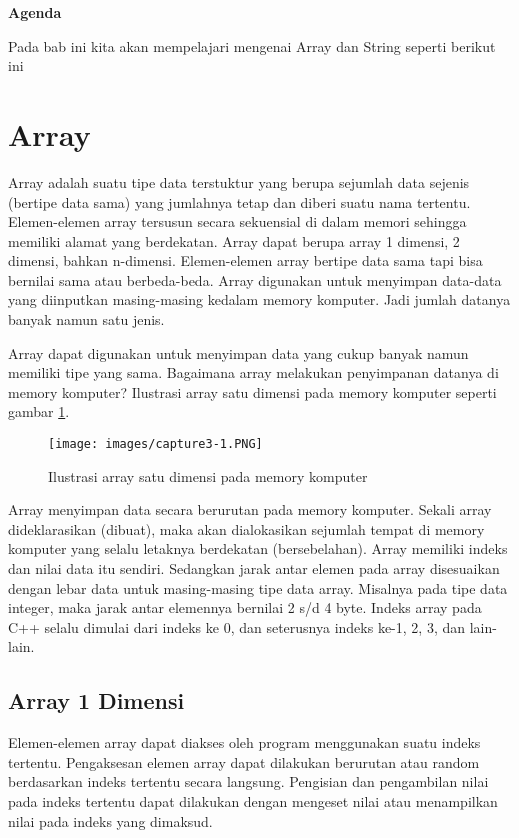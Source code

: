 \textbf{Agenda}

Pada bab ini kita akan mempelajari mengenai Array dan String seperti berikut ini

\minitoc

\section{ Array}\label{array}

Array adalah suatu tipe data terstuktur yang berupa sejumlah data
sejenis (bertipe data sama) yang jumlahnya tetap dan diberi suatu nama
tertentu. Elemen-elemen array tersusun secara sekuensial di dalam memori
sehingga memiliki alamat yang berdekatan. Array dapat berupa array 1
dimensi, 2 dimensi, bahkan n-dimensi. Elemen-elemen array bertipe data
sama tapi bisa bernilai sama atau berbeda-beda. Array digunakan untuk
menyimpan data-data yang diinputkan masing-masing kedalam memory
komputer. Jadi jumlah datanya banyak namun satu jenis.

Array dapat digunakan untuk menyimpan data yang cukup banyak namun
memiliki tipe yang sama. Bagaimana array melakukan penyimpanan datanya
di memory komputer? Ilustrasi array satu dimensi pada memory komputer 
seperti gambar \ref{gambar3-1}.

\begin{figure}[htbp]
\centering
\texttt{[image: images/capture3-1.PNG]}
\label{gambar3-1}
\caption{Ilustrasi array satu dimensi pada memory komputer}
\end{figure}

Array menyimpan data secara berurutan pada memory komputer. Sekali array
dideklarasikan (dibuat), maka akan dialokasikan sejumlah tempat di
memory komputer yang selalu letaknya berdekatan (bersebelahan). Array
memiliki indeks dan nilai data itu sendiri. Sedangkan jarak antar elemen
pada array disesuaikan dengan lebar data untuk masing-masing tipe data
array. Misalnya pada tipe data integer, maka jarak antar elemennya
bernilai 2 s/d 4 byte. Indeks array pada C++ selalu dimulai dari indeks
ke 0, dan seterusnya indeks ke-1, 2, 3, dan lain-lain.

\subsection{Array 1 Dimensi}\label{array-1-dimensi}

Elemen-elemen array dapat diakses oleh program menggunakan suatu indeks
tertentu. Pengaksesan elemen array dapat dilakukan berurutan atau random
berdasarkan indeks tertentu secara langsung. Pengisian dan pengambilan
nilai pada indeks tertentu dapat dilakukan dengan mengeset nilai atau
menampilkan nilai pada indeks yang dimaksud.

